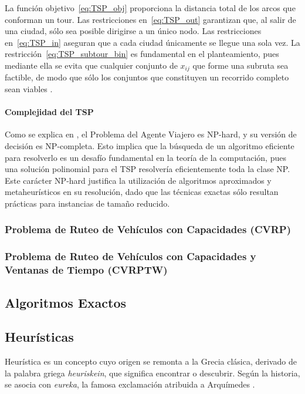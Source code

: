 \documentclass[12pt,titlepage,twoside,openright]{book}
\begin{document}
La función objetivo~\eqref{eq:TSP_obj} proporciona la distancia total de los arcos que conforman un tour. Las restricciones en~\eqref{eq:TSP_out} garantizan que, al salir de una ciudad, sólo sea posible dirigirse a un único nodo. Las restricciones en~\eqref{eq:TSP_in} aseguran que a cada ciudad únicamente se llegue una sola vez. La restricción~\eqref{eq:TSP_subtour_bin} es fundamental en el planteamiento, pues mediante ella se evita que cualquier conjunto de \(x_{ij}\) que forme una subruta sea factible, de modo que sólo los conjuntos que constituyen un recorrido completo sean viables \citep{torres2018}.

\paragraph{Complejidad del TSP}

Como se explica en \cite{papadimitriou1998}, el Problema del Agente Viajero es NP-hard, y su versión de decisión es NP-completa. Esto implica que la búsqueda de un algoritmo eficiente para resolverlo es un desafío fundamental en la teoría de la computación, pues una solución polinomial para el TSP resolvería eficientemente toda la clase NP. Este carácter NP-hard justifica la utilización de algoritmos aproximados y metaheurísticos en su resolución, dado que las técnicas exactas sólo resultan prácticas para instancias de tamaño reducido.

\subsubsection{Problema de Ruteo de Vehículos con Capacidades (CVRP)}

\subsubsection{Problema de Ruteo de Vehículos con Capacidades y Ventanas de Tiempo (CVRPTW)}




\subsection{Algoritmos Exactos}

\subsection{Heurísticas}

Heurística es un concepto cuyo origen se remonta a la Grecia clásica, derivado de la palabra griega \textit{heuriskein}, que significa encontrar o descubrir. Según la historia, se asocia con \textit{eureka}, la famosa exclamación atribuida a Arquímedes \citep{antonioSuarez2014}.
\end{document}
